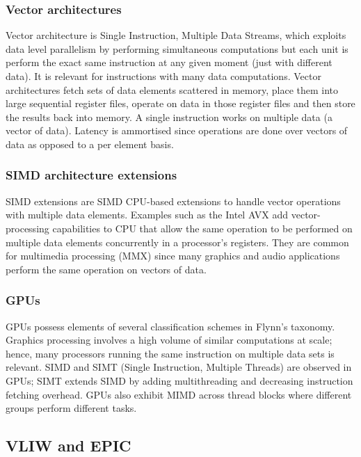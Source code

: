 \documentclass[a4paper, 12pt, oneside]{book}
\begin{document}
\subsubsection{Vector architectures}
Vector architecture is Single Instruction, Multiple Data Streams, which exploits data level parallelism by performing simultaneous computations but each unit is perform the exact same instruction at any given moment (just with different data). It is relevant for instructions with many data computations. Vector architectures fetch sets of data elements scattered in memory, place them into large sequential register files, operate on data in those register files and then store the results back into memory. A single instruction works on multiple data (a vector of data). Latency is ammortised since operations are done over vectors of data as opposed to a per element basis.

\subsubsection{SIMD architecture extensions}

SIMD extensions are SIMD CPU-based extensions to handle vector operations with multiple data elements. Examples such as the Intel AVX add vector-processing capabilities to CPU that allow the same operation to be performed on multiple data elements concurrently in a processor's registers. They are common for multimedia processing (MMX) since many graphics and audio applications perform the same operation on vectors of data.

\subsubsection{GPUs}

GPUs possess elements of several classification schemes in Flynn's taxonomy. Graphics processing involves a high volume of similar computations at scale; hence, many processors running the same instruction on multiple data sets is relevant. SIMD and SIMT (Single Instruction, Multiple Threads) are observed in GPUs; SIMT extends SIMD by adding multithreading and decreasing instruction fetching overhead. GPUs also exhibit MIMD across thread blocks where different groups perform different tasks.

\subsection{VLIW and EPIC}
\end{document}

